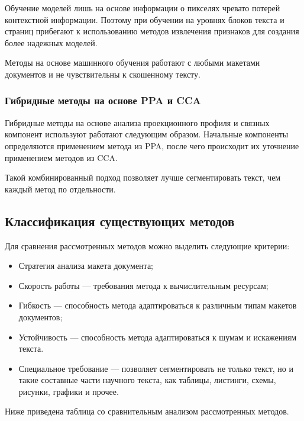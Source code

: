Обучение моделей лишь на основе информации о пикселях чревато потерей контекстной информации.
Поэтому при обучении на уровнях блоков текста и страниц прибегают к использованию методов извлечения признаков для создания более надежных моделей.~\cite{dla-survey}

Методы на основе машинного обучения работают с любыми макетами документов и не чувствительны к скошенному тексту.

\subsubsection{Гибридные методы на основе PPA и CCA}

Гибридные методы на основе анализа проекционного профиля и связных компонент используют работают следующим образом.
Начальные компоненты определяются применением метода из PPA, после чего происходит их уточнение применением методов из CCA.

Такой комбинированный подход позволяет лучше сегментировать текст, чем каждый метод по отдельности.

\subsection{Классификация существующих методов}


Для сравнения рассмотренных методов можно выделить следующие критерии:
\begin{itemize}
    \item Стратегия анализа макета документа;
    \item Скорость работы --- требования метода к вычислительным ресурсам;
    \item Гибкость --- способность метода адаптироваться к различным типам макетов документов;
    \item Устойчивость --- способность метода адаптироваться к шумам и искажениям текста.
    \item Специальное требование --- позволяет сегментировать не только текст, но и такие составные части научного текста, как таблицы, листинги, схемы, рисунки, графики и прочее.
\end{itemize}

Ниже приведена таблица со сравнительным анализом рассмотренных методов.

